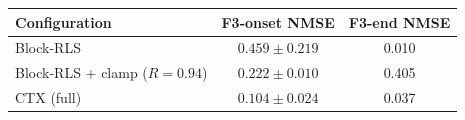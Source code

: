 \begin{tabular}{lcc}
\toprule
Configuration & F3-onset NMSE & F3-end NMSE \\
\midrule
Block-RLS & $0.459\pm0.219$ & 0.010 \\
Block-RLS + clamp ($R{=}0.94$) & $0.222\pm0.010$ & 0.405 \\
CTX (full) & $\mathbf{0.104\pm0.024}$ & 0.037 \\
\bottomrule
\end{tabular}